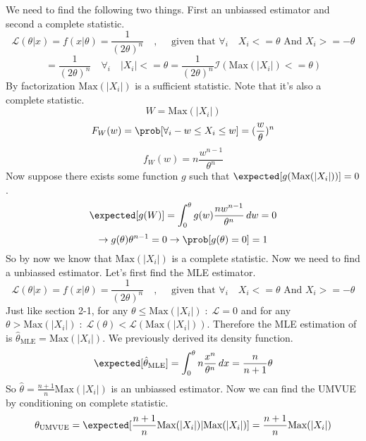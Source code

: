 We need to find the following two things. First an unbiassed estimator and second a complete statistic. 
$$
\mathcal{L}(\theta | x) = f(x|\theta) = \frac{1}{(2\theta)^n} \quad,\quad\text{ given that }\forall_i\quad X_i <= \theta \text{ And }X_i >= -\theta
$$
$$
= \frac{1}{(2\theta)^n} \quad\forall_i\quad |X_i| <= \theta = \frac{1}{(2\theta)^n}\mathcal{I}(\text{Max}(|X_i|) <= \theta)
$$
By factorization $\text{Max}(|X_i|)$ is a sufficient statistic. Note that it's also a complete statistic.
$$
W = \text{Max}(|X_i|)
$$
$$
F_W(w) = \prob[\forall_i-w\leq X_i\leq w] = (\frac{w}{\theta})^n
$$
$$
f_W(w) = n\frac{w^{n - 1}}{\theta^n}
$$
Now suppose there exists some function $g$ such that $\expected[g(\text{Max}(|X_i|))] = 0$.
$$
\expected[g(W)] = \int_0^\theta g(w)\frac{nw^{n - 1}}{\theta^n}\,dw = 0
$$
$$
\rightarrow g(\theta)\theta^{n - 1} = 0 \rightarrow \prob[g(\theta) = 0] = 1
$$
So by now we know that $\text{Max}(|X_i|)$ is a complete statistic. Now we need to find a unbiassed estimator. Let's first find the MLE estimator.
$$
\mathcal{L}(\theta | x) = f(x|\theta) = \frac{1}{(2\theta)^n} \quad,\quad\text{ given that }\forall_i\quad X_i <= \theta \text{ And }X_i >= -\theta
$$
Just like section 2-1, for any $\theta \leq \text{Max}(|X_i|)\;:\;\mathcal{L} = 0$ and for any $\theta > \text{Max}(|X_i|) \;:\;\mathcal{L}(\theta) < \mathcal{L}(\text{Max}(|X_i|))$. Therefore 
the MLE estimation of is $\hat{\theta}_{\text{MLE}} = \text{Max}(|X_i|)$. We previously derived its density function.
$$
\expected[\hat{\theta}_{\text{MLE}}] = \int_0^\theta n\frac{x^n}{\theta^n}\,dx = \frac{n}{n + 1}\theta
$$
So $\hat{\theta} = \frac{n+1}{n}\text{Max}(|X_i|)$ is an unbiassed estimator. Now we can find the UMVUE by conditioning on complete statistic.
$$
\theta_{\text{UMVUE}} = \expected[\frac{n+1}{n}\text{Max}(|X_i|) | \text{Max}(|X_i|)] = \frac{n+1}{n}\text{Max}(|X_i|)
$$